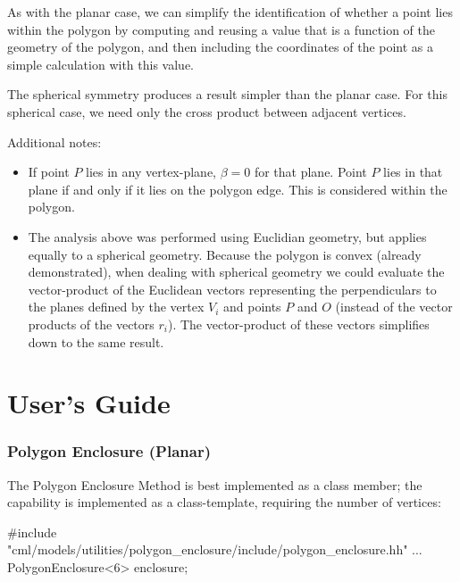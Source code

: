 \documentclass[11pt,fleqn]{report}
\begin{document}
As with the planar case, we can simplify the identification of whether a
point lies within the polygon by computing and reusing a value that is a
function of the geometry of the polygon, and then including the coordinates of
the point as a simple calculation with this value.

The spherical symmetry produces a result simpler than the planar case. For
this spherical case, we need only the cross product between adjacent
vertices.

Additional notes:
\begin{itemize}
\item If point $P$ lies in any vertex-plane, $\beta = 0$ for that plane.
  Point $P$ lies in that plane if and only if it lies on the polygon edge.
  This is considered within the polygon.
\item The analysis above was performed using Euclidian geometry, but applies
  equally to a spherical geometry. Because the polygon is convex (already
  demonstrated), when dealing with spherical geometry we could evaluate the
  vector-product of the Euclidean vectors representing the
  perpendiculars to the planes defined by the vertex $V_i$ and points $P$ and
  $O$ (instead of the vector products of the vectors $r_i$).
  The vector-product of these vectors simplifies down to the same result.
\end{itemize}

\chapter{User's Guide}

\subsection{Polygon Enclosure (Planar)}
The Polygon Enclosure Method is best implemented as a class member; the
capability is implemented as a class-template, requiring the number of
vertices:
\begin{code}
#include "cml/models/utilities/polygon_enclosure/include/polygon_enclosure.hh"
...
PolygonEnclosure<6> enclosure;
\end{code}
\end{document}
